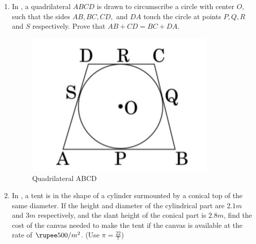                                                                                                               \begin{enumerate}
\item In , a quadrilateral $ABCD$ is drawn to circumscribe a circle with center $O$, such that the sides $AB, BC, CD,$ and $DA$ touch the circle at points $P, Q, R$ and $S$ respectively. Prove that $AB + CD = BC + DA$.
    \begin{figure}[H]
        \includegraphics[width=\columnwidth]{figs/quadrilateralABCD.jpg}
        \caption{Quadrilateral ABCD}
        \label{fig:quadrilateralABCD}
    \end{figure}
\item In , a tent is in the shape of a cylinder surmounted by a conical top of the same diameter. If the height and diameter of the cylindrical part are $2.1 m$ and $3 m$ respectively, and the slant height of the conical part is $2.8 m$, find the cost of the canvas needed to make the tent if the canvas is available at the rate of $\rupee 500/ m^2$. (Use $\pi = \frac{22}{7}$)
    \begin{figure}[H]

\end{figure}
\end{enumerate}
